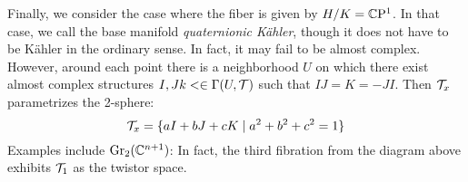 \documentclass{scrartcl}
\begin{document}
Finally, we consider the case where the fiber is given by $H/K=\mathbb{C}\mathrm{P}^1$. In that case, we call the base manifold \emph{quaternionic K\"{a}hler}, though it does not have to be K\"{a}hler in the ordinary sense. In fact, it may fail to be almost complex. However, around each point there is a neighborhood $U$ on which there exist almost complex structures $I,Jk<\in \Gamma(U,\mathcal{T})$ such that $IJ=K=-JI$. Then $\mathcal{T}_x$ parametrizes the 2-sphere:
\begin{equation*}
\mathcal{T}_x=\{aI+bJ+cK\mid a^2+b^2+c^2=1\}
\end{equation*}
Examples include $\operatorname{Gr}_2(\mathbb{C}^{n+1})$: In fact, the third fibration from the diagram above exhibits $\mathcal{T}_1$ as the twistor space.
\end{document}
